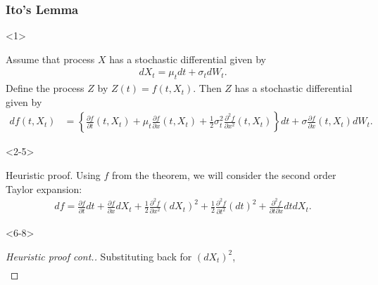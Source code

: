 \documentclass[10pt]{beamer}
\begin{document}
\begin{frame}[t]
  \frametitle{Ito's Lemma}
  \begin{onlyenv}<1>
  \begin{theorem}
    Assume that process $X$ has a stochastic differential given by 
    \begin{align*}
      dX_t = \mu_t dt + \sigma_t dW_t.
    \end{align*}
    Define the process $Z$ by $Z(t) = f(t, X_t)$. Then $Z$ has a stochastic differential given by
    \begin{align*}
      df(t, X_t) &= \left\{\frac{\partial f}{\partial t}(t, X_t) + \mu_t \frac{\partial f}{\partial x}(t,X_t) + \frac{1}{2}\sigma^2_t\frac{\partial^2 f}{\partial x^2}(t,X_t)\right\}dt + \sigma \frac{\partial f}{\partial x}(t, X_t)dW_t.
    \end{align*}
  \end{theorem}
  \end{onlyenv}
  \begin{onlyenv}<2-5>
    \begin{block}{Heuristic proof.}
      Using $f$ from the theorem, we will consider the second order Taylor expansion:
      \begin{align*}
        df = \frac{\partial f}{\partial t}dt + \frac{\partial f}{\partial x}dX_t + \frac{1}{2}\frac{\partial^2 f}{\partial x ^2}(dX_t)^2 + \frac{1}{2}\frac{\partial^2 f}{\partial t^2}(dt)^2 + \frac{\partial^2 f}{\partial t \partial x}dt dX_t.
      \end{align*}
    \end{block}
  \end{onlyenv}
  \begin{onlyenv}<6-8>
    \begin{proof}[Heuristic proof cont.]
      Substituting back for $(dX_t)^2$,
      \begin{align*}

\end{align*}
\end{proof}
\end{onlyenv}
\end{frame}
\end{document}
